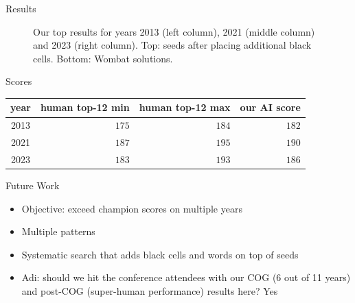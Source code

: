 \documentclass[aspectratio=169,usenames,dvipsnames]{beamer}
\newcommand{\tcg}[1]{\textcolor{m5}{#1}}
\newcommand{\tcm}[1]{\textcolor{m7}{#1}}
\newcommand{\bei}{\begin{itemize}}
\newcommand{\eei}{\end{itemize}}
\newcommand{\ie}{\item}
\numberwithin{equation}{section}
\numberwithin{theorem}{section}
\numberwithin{lem}{section}
\numberwithin{df}{section}
\begin{document}
\begin{frame}{Results}
\begin{figure}
\caption{Our top results for years 2013 (left column), 2021 (middle column) and 2023 (right column). Top: seeds after placing additional black cells. Bottom: {\sc Wombat} solutions.}
\end{figure}

\end{frame}


\begin{frame}{Scores}

\begin{table}[htbp]
\centering
\begin{tabular}{c|r|r|r}
\toprule
{\bf year} & {\bf human top-12 min} & {\bf human top-12 max} & {\bf our AI score} \\
\midrule
2013 & $175$ & $184$ & \tcg{$182$} \\ 
2021 & $187$ & $195$ & \tcg{$190$} \\ 
2023 & $183$ & $193$ & \tcg{$186$} \\ 
\bottomrule
\end{tabular}
\end{table}


\end{frame}




\begin{frame}{Future Work}

\bei

\ie Objective: exceed champion scores on multiple years

\ie Multiple patterns

\ie Systematic search that adds black cells and words on top of seeds

\bigskip

\ie \tcm{Adi: should we hit the conference attendees with our COG (6 out of 11 years) and post-COG (super-human performance) results here?} \tcm{Yes}

\bigskip

\eei


\end{frame}


\end{document}
